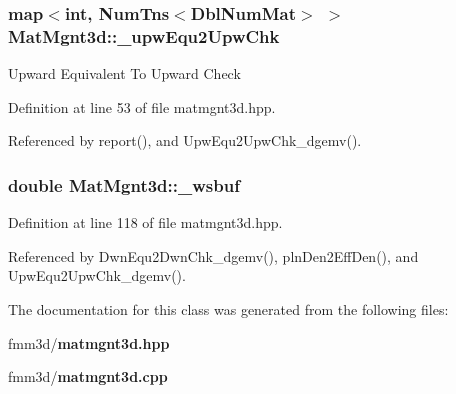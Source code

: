 \subsubsection{\setlength{\rightskip}{0pt plus 5cm}map$<$int, Num\-Tns$<$Dbl\-Num\-Mat$>$ $>$ {\bf Mat\-Mgnt3d::\_\-upw\-Equ2Upw\-Chk}}\label{classMatMgnt3d_99d61bd38f82cf6e8a44bdfe501e2dda_99d61bd38f82cf6e8a44bdfe501e2dda}


Upward Equivalent To Upward Check 

Definition at line 53 of file matmgnt3d.hpp.

Referenced by report(), and Upw\-Equ2Upw\-Chk\_\-dgemv().
\subsubsection{\setlength{\rightskip}{0pt plus 5cm}double {\bf Mat\-Mgnt3d::\_\-wsbuf}\hspace{0.3cm}{\tt  [static]}}\label{classMatMgnt3d_526f8f4a77395e52ecb0eb6d09440edc_526f8f4a77395e52ecb0eb6d09440edc}




Definition at line 118 of file matmgnt3d.hpp.

Referenced by Dwn\-Equ2Dwn\-Chk\_\-dgemv(), pln\-Den2Eff\-Den(), and Upw\-Equ2Upw\-Chk\_\-dgemv().

The documentation for this class was generated from the following files:\begin{CompactItemize}
\item 
fmm3d/{\bf matmgnt3d.hpp}\item 
fmm3d/{\bf matmgnt3d.cpp}\end{CompactItemize}
